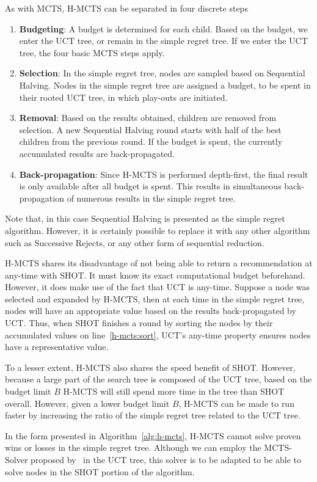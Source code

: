 \documentclass{kecsmstr}
\begin{document}
As with MCTS, H-MCTS can be separated in four discrete steps
\begin{enumerate}
\item \textbf{Budgeting}: A budget is determined for each child. Based on the budget, we enter the UCT tree, or remain in the simple regret tree. If we enter the UCT tree, the four basic MCTS steps apply.
\item \textbf{Selection}: In the simple regret tree, nodes are sampled based on Sequential Halving. Nodes in the simple regret tree are assigned a budget, to be spent in their rooted UCT tree, in which play-outs are initiated.
\item \textbf{Removal}: Based on the results obtained, children are removed from selection. A new Sequential Halving round starts with half of the best children from the previous round. If the budget is spent, the currently accumulated results are back-propagated.
\item \textbf{Back-propagation}: Since H-MCTS is performed depth-first, the final result is only available after all budget is spent. This results in simultaneous back-propagation of numerous results in the simple regret tree.
\end{enumerate}
Note that, in this case Sequential Halving is presented as the simple regret algorithm. However, it is certainly possible to replace it with any other algorithm such as Successive Rejects, or any other form of sequential reduction.

H-MCTS shares its disadvantage of not being able to return a recommendation at any-time with SHOT. It must know its exact computational budget beforehand. However, it does make use of the fact that UCT is any-time. Suppose a node was selected and expanded by H-MCTS, then at each time in the simple regret tree, nodes will have an appropriate value based on the results back-propagated by UCT. Thus, when SHOT finishes a round by sorting the nodes by their accumulated values on line~\ref{h-mcts:sort}, UCT's any-time property ensures nodes have a representative value.

To a lesser extent, H-MCTS also shares the speed benefit of SHOT. However, because a large part of the search tree is composed of the UCT tree, based on the budget limit $B$ H-MCTS will still spend more time in the tree than SHOT overall. However, given a lower budget limit $B$, H-MCTS can be made to run faster by increasing the ratio of the simple regret tree related to the UCT tree.

In the form presented in Algorithm~\ref{alg:h-mcts}, H-MCTS cannot solve proven wins or losses in the simple regret tree. Although we can employ the MCTS-Solver proposed by~ in the UCT tree, this solver is to be adapted to be able to solve nodes in the SHOT portion of the algorithm.
\newpage
\end{document}
